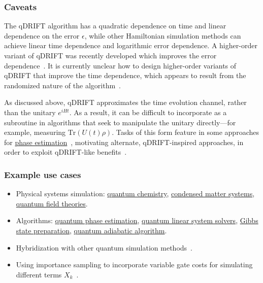 \begin{refsection}
\subsubsection*{Caveats}

The qDRIFT algorithm has a quadratic dependence on time and linear dependence on the error $\epsilon$, while other Hamiltonian simulation methods can achieve linear time dependence and logarithmic error dependence. A higher-order variant of qDRIFT was recently developed which improves the error dependence~\cite{nakaji2023qswift}. It is currently unclear how to design higher-order variants of qDRIFT that improve the time dependence, which appears to result from the randomized nature of the algorithm~\cite{chen2021conRandomProduct}. 

As discussed above, qDRIFT approximates the time evolution channel, rather than the unitary $e^{iHt}$. As a result, it can be difficult to incorporate as a subroutine in algorithms that seek to manipulate the unitary directly---for example, measuring $\mathrm{Tr}\left(U(t) \rho \right)$. Tasks of this form feature in some approaches for \hyperref[prim:QPE]{phase estimation}~\cite{lin2022HeisenbergLimited}, motivating alternate, qDRIFT-inspired approaches, in order to exploit qDRIFT-like benefits~\cite{wan2021RandPhaseEst}.




\subsubsection*{Example use cases}

\begin{itemize}
\item Physical systems simulation: \hyperref[appl:QuantumChemistry]{quantum chemistry}, \hyperref[appl:CondensedMatter]{condensed matter systems}, \hyperref[appl:QuantumFieldTheories]{quantum field theories}. 
\item Algorithms: \hyperref[prim:QPE]{quantum phase estimation}, \hyperref[prim:QuantumLinearSystemSolvers]{quantum linear system solvers}, \hyperref[prim:GibbsSampling]{Gibbs state preparation}, \hyperref[prim:QuantumAdiabaticAlgorithm]{quantum adiabatic algorithm}.
\item Hybridization with other quantum simulation methods~\cite{Ouyang2020compilation,Rajput2022HybridizedMF, hagan2022CompositeSimulation}. 
\item Using importance sampling to incorporate variable gate costs for simulating different terms $X_k$~\cite{kiss2022ImportanceQdrift}.
\end{itemize}




\printbibliography[heading=secbib,segment=\therefsegment]
\end{refsection}

